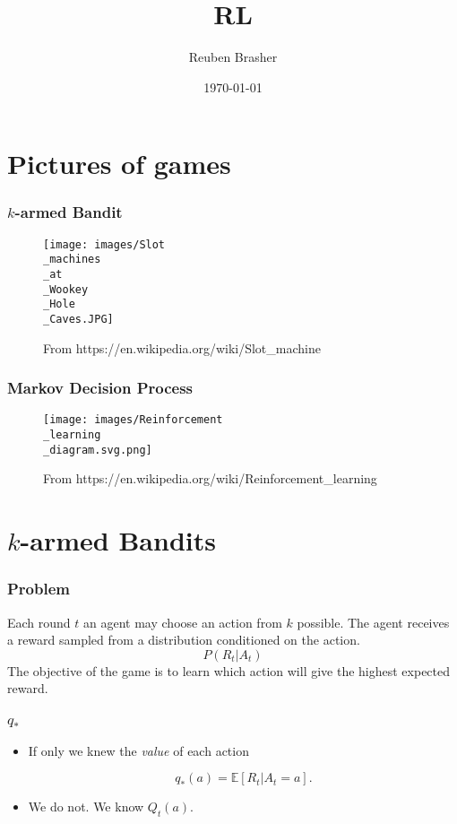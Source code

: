 \documentclass{beamer}
\title{RL}
\author{Reuben Brasher}
\date{\today}
\begin{document}
\frame{\titlepage}

\section[Outline]{}
\frame{\tableofcontents}

\section{Pictures of games}

\frame
{
   \frametitle{$k$-armed Bandit}
   
   
   \begin{figure}[ht]
      \texttt{[image: images/Slot\\\_machines\\\_at\\\_Wookey\\\_Hole\\\_Caves.JPG]}
      \caption{From https://en.wikipedia.org/wiki/Slot\_machine} \label{fig:narmed}
   \end{figure}
}

\frame
{
   \frametitle{Markov Decision Process}
   
   
   \begin{figure}[ht]
      \texttt{[image: images/Reinforcement\\\_learning\\\_diagram.svg.png]}
      \caption{From https://en.wikipedia.org/wiki/Reinforcement\_learning} \label{fig:mdp}
   \end{figure}
}

\section{$k$-armed Bandits}

\frame
{
   \frametitle{Problem}

   Each round $t$ an agent may choose an action from $k$ possible. The agent
   receives a reward sampled from a distribution conditioned on the action.
   $$P(R_t|A_t)$$
   The objective of the game is to learn which action will give the highest
   expected reward.
}

\frame
{
   \frametitle{$q_*$}

   \begin{itemize}
      \item<1-> If only we knew the \textit{value} of each action

      $$q_*(a) = \mathbb{E} [R_t | A_t=a].$$

      \item<2-> We do not. We know $Q_t(a)$.

   \end{itemize}
}
\end{document}
